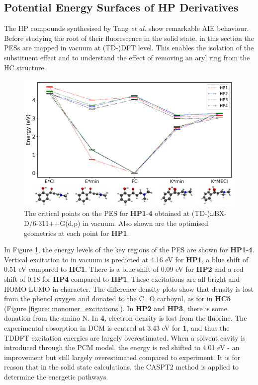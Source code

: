 \subsection{Potential Energy Surfaces of \textbf{HP} Derivatives} \label{section: Connecting_Vacuum}
The \acf{HP} compounds synthesised by Tang \textit{et al.} show remarkable \ac{AIE} behaviour.  Before studying the root of their fluorescence in the solid state, in this section the \acp{PES} are mapped in vacuum at (TD-)DFT level. This enables the isolation of the substituent effect and to understand the effect of removing an aryl ring from the \ac{HC} structure. 
\begin{figure}[H]
\centering
  \includegraphics[width=0.8\linewidth]{5ConnectingCrystalStructure/2HP_energies_vac.pdf}
  \caption[The vacuum PES of HP\textbf{1}-\textbf{4} with TDDFT]{The critical points on the \ac{PES} for \textbf{HP}\textbf{1}-\textbf{4} obtained at (TD-)$\omega$BX-D/6-311++G(d,p) in vacuum. Also shown are the optimised geometries at each point for \textbf{HP1}.}
  \label{figure: HP_energies_vac}
\end{figure}
In Figure \ref{figure: HP_energies_vac}, the energy levels of the key regions of the \ac{PES} are shown for \textbf{HP1}-\textbf{4}. Vertical excitation to \sone{} in vacuum is predicted at 4.16 eV for \textbf{HP1}, a blue shift of 0.51 eV compared to \textbf{HC1}.  There is a blue shift of 0.09 eV for \textbf{HP2} and a red shift of 0.18 for \textbf{HP4} compared to \textbf{HP1}. These excitations are all  bright and HOMO-LUMO in character. The difference density plots show that density is lost from the phenol oxygen and donated to the C=O carboynl, as for \sone{} in \textbf{HC5} (Figure \ref{figure: monomer_excitations}). In \textbf{HP2} and \textbf{HP3}, there is some donation from the amino N. In \textbf{4}, electron density is lost from the fluorine. The experimental absorption in DCM is centred at 3.43 eV for \textbf{1}, and thus the TDDFT excitation energies are largely overestimated. When a solvent cavity is introduced through the \ac{PCM} model, the \sone{} energy is red shifted to 4.01 eV - an improvement but still largely overestimated compared to experiment. It is for reason that in the solid state calculations, the CASPT2 method is applied to determine the energetic pathways.

